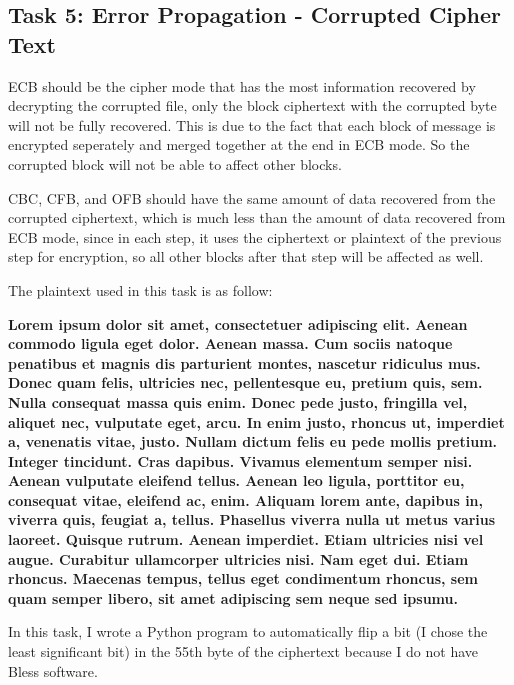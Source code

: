 \documentclass{article}
\begin{document}
\subsection{Task 5: Error Propagation - Corrupted Cipher Text}

ECB should be the cipher mode that has the most information recovered by decrypting
the corrupted file, only the block ciphertext with the corrupted byte will not
be fully recovered. This is due to the fact that each block of message is
encrypted seperately and merged together at the end in ECB mode. So the corrupted
block will not be able to affect other blocks.

CBC, CFB, and OFB should have the same amount of data recovered from the corrupted
ciphertext, which is much less than the amount of data recovered from ECB mode,
since in each step, it uses the ciphertext or plaintext of the previous step for
encryption, so all other blocks after that step will be affected as well.

The plaintext used in this task is as follow:

\textbf{
Lorem ipsum dolor sit amet, consectetuer adipiscing elit. Aenean commodo ligula
eget dolor. Aenean massa. Cum sociis natoque penatibus et magnis dis parturient
montes, nascetur ridiculus mus. Donec quam felis, ultricies nec, pellentesque eu,
pretium quis, sem. Nulla consequat massa quis enim. Donec pede justo, fringilla
vel, aliquet nec, vulputate eget, arcu. In enim justo, rhoncus ut, imperdiet a,
venenatis vitae, justo. Nullam dictum felis eu pede mollis pretium. Integer
tincidunt. Cras dapibus. Vivamus elementum semper nisi. Aenean vulputate eleifend
tellus. Aenean leo ligula, porttitor eu, consequat vitae, eleifend ac, enim.
Aliquam lorem ante, dapibus in, viverra quis, feugiat a, tellus. Phasellus viverra
nulla ut metus varius laoreet. Quisque rutrum. Aenean imperdiet. Etiam ultricies
nisi vel augue. Curabitur ullamcorper ultricies nisi. Nam eget dui. Etiam rhoncus.
Maecenas tempus, tellus eget condimentum rhoncus, sem quam semper libero, sit amet
adipiscing sem neque sed ipsumu.
}

In this task, I wrote a Python program to automatically flip a bit (I chose the
least significant bit) in the 55th byte of the ciphertext because I do not have
Bless software.
\end{document}
